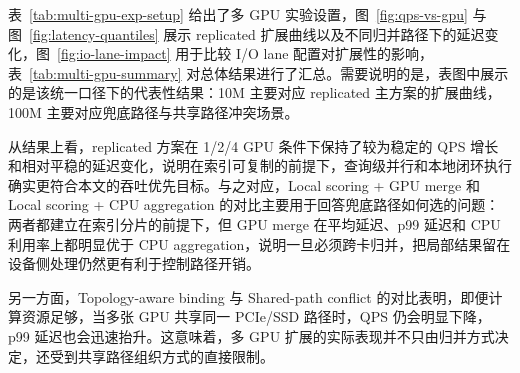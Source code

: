 表~\ref{tab:multi-gpu-exp-setup} 给出了多 GPU 实验设置，图~\ref{fig:qps-vs-gpu} 与图~\ref{fig:latency-quantiles} 展示 replicated 扩展曲线以及不同归并路径下的延迟变化，图~\ref{fig:io-lane-impact} 用于比较 I/O lane 配置对扩展性的影响，表~\ref{tab:multi-gpu-summary} 对总体结果进行了汇总。需要说明的是，表图中展示的是该统一口径下的代表性结果：10M 主要对应 replicated 主方案的扩展曲线，100M 主要对应兜底路径与共享路径冲突场景。

从结果上看，replicated 方案在 1/2/4 GPU 条件下保持了较为稳定的 QPS 增长和相对平稳的延迟变化，说明在索引可复制的前提下，查询级并行和本地闭环执行确实更符合本文的吞吐优先目标。与之对应，Local scoring + GPU merge 和 Local scoring + CPU aggregation 的对比主要用于回答兜底路径如何选的问题：两者都建立在索引分片的前提下，但 GPU merge 在平均延迟、p99 延迟和 CPU 利用率上都明显优于 CPU aggregation，说明一旦必须跨卡归并，把局部结果留在设备侧处理仍然更有利于控制路径开销。

另一方面，Topology-aware binding 与 Shared-path conflict 的对比表明，即便计算资源足够，当多张 GPU 共享同一 PCIe/SSD 路径时，QPS 仍会明显下降，p99 延迟也会迅速抬升。这意味着，多 GPU 扩展的实际表现并不只由归并方式决定，还受到共享路径组织方式的直接限制。

